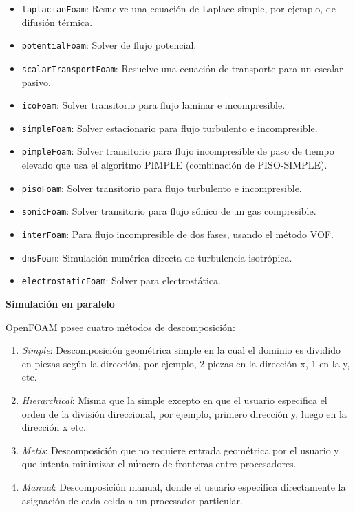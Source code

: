\begin{itemize}
\item
  \texttt{laplacianFoam}: Resuelve una ecuación de Laplace simple, por
  ejemplo, de difusión térmica.
\item
  \texttt{potentialFoam}: Solver de flujo potencial.
\item
  \texttt{scalarTransportFoam}: Resuelve una ecuación de transporte para
  un escalar pasivo.
\item
  \texttt{icoFoam}: Solver transitorio para flujo laminar e
  incompresible.
\item
  \texttt{simpleFoam}: Solver estacionario para flujo turbulento e
  incompresible.
\item
  \texttt{pimpleFoam}: Solver transitorio para flujo incompresible de
  paso de tiempo elevado que usa el algoritmo PIMPLE (combinación de
  PISO-SIMPLE).
\item
  \texttt{pisoFoam}: Solver transitorio para flujo turbulento e
  incompresible.
\item
  \texttt{sonicFoam}: Solver transitorio para flujo sónico de un gas
  compresible.
\item
  \texttt{interFoam}: Para flujo incompresible de dos fases, usando el
  método VOF.
\item
  \texttt{dnsFoam}: Simulación numérica directa de turbulencia
  isotrópica.
\item
  \texttt{electrostaticFoam}: Solver para electrostática.
\end{itemize}

\textbf{Simulación en paralelo}

OpenFOAM posee cuatro métodos de descomposición:

\begin{enumerate}
\def\labelenumi{\arabic{enumi}.}
\item
  \emph{Simple}: Descomposición geométrica simple en la cual el dominio
  es dividido en piezas según la dirección, por ejemplo, 2 piezas en la
  dirección x, 1 en la y, etc.
\item
  \emph{Hierarchical}: Misma que la simple excepto en que el usuario
  especifica el orden de la división direccional, por ejemplo, primero
  dirección y, luego en la dirección x etc.
\item
  \emph{Metis}: Descomposición que no requiere entrada geométrica por el
  usuario y que intenta minimizar el número de fronteras entre
  procesadores.
\item
  \emph{Manual}: Descomposición manual, donde el usuario especifica
  directamente la asignación de cada celda a un procesador particular.
\end{enumerate}

